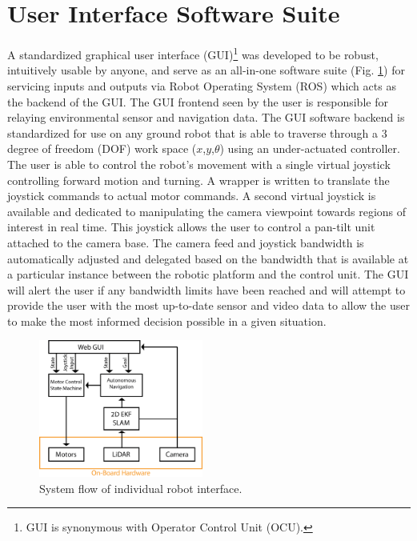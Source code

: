 \section{User Interface Software Suite}\label{sec:ui}

A standardized graphical user interface (GUI)\footnote{GUI is synonymous with Operator Control Unit (OCU).} was developed to be robust, intuitively usable by anyone, and serve as an all-in-one software suite (Fig. \ref{fig:gui_flow}) for servicing inputs and outputs via Robot Operating System (ROS) which acts as the backend of the GUI. The GUI frontend seen by the user is responsible for relaying environmental sensor and navigation data. The GUI software backend is standardized for use on any ground robot that is able to traverse through a 3 degree of freedom (DOF) work space ($x$,$y$,$\theta$) using an under-actuated controller. The user is able to control the robot's movement with a single virtual joystick controlling forward motion and turning. A wrapper is written to translate the joystick commands to actual motor commands. A second virtual joystick is available and dedicated to manipulating the camera viewpoint towards regions of interest in real time. This joystick allows the user to control a pan-tilt unit attached to the camera base. The camera feed and joystick bandwidth is automatically adjusted and delegated based on the bandwidth that is available at a particular instance between the robotic platform and the control unit. The GUI will alert the user if any bandwidth limits have been reached and will attempt to provide the user with the most up-to-date sensor and video data to allow the user to make the most informed decision possible in a given situation. 

\begin{figure}
	\centering
	\includegraphics[width=0.48\textwidth]{pictures/Korpela_GUI.png}
	\caption{System flow of individual robot interface.}
	\label{fig:gui_flow}
\end{figure}

